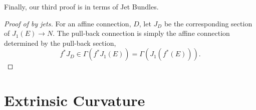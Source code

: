 \documentclass{amsart}
\begin{document}
Finally, our third proof is in terms of Jet Bundles.

\begin{proof}[Proof of  by jets]
For an affine connection, \(D\), let \(J_D\) be the corresponding section of \(J_1(E) \to N\). The pull-back connection is simply the affine connection determined by the pull-back section,
\[
f^{\ast} J_D \in \Gamma(f^{\ast} J_1(E)) = \Gamma(J_1(f^{\ast}(E))).
\]
\end{proof}

\section{Extrinsic Curvature}
\end{document}
